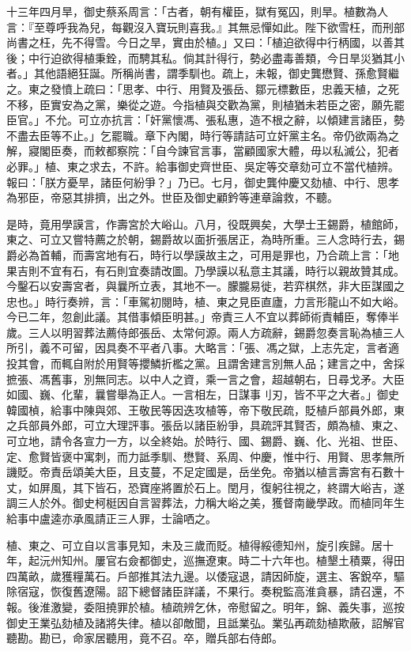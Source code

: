 \begin{pinyinscope}
十三年四月旱，御史蔡系周言：「古者，朝有權臣，獄有冤囚，則旱。植數為人言：『至尊呼我為兒，每觀沒入寶玩則喜我。』其無忌憚如此。陛下欲雪枉，而刑部尚書之枉，先不得雪。今日之旱，實由於植。」又曰：「植迫欲得中行柄國，以善其後；中行迫欲得植秉銓，而騁其私。倘其計得行，勢必盡毒善類，今日旱災猶其小者。」其他語絕狂誕。所稱尚書，謂季馴也。疏上，未報，御史龔懋賢、孫愈賢繼之。東之發憤上疏曰：「思孝、中行、用賢及張岳、鄒元標數臣，忠義天植，之死不移，臣實安為之黨，樂從之遊。今指植與交歡為黨，則植猶未若臣之密，願先罷臣官。」不允。可立亦抗言：「奸黨懷馮、張私惠，造不根之辭，以傾建言諸臣，勢不盡去臣等不止。」乞罷職。章下內閣，時行等請詰可立奸黨主名。帝仍欲兩為之解，寢閣臣奏，而敕都察院：「自今諫官言事，當顧國家大體，毋以私滅公，犯者必罪。」植、東之求去，不許。給事御史齊世臣、吳定等交章劾可立不當代植辨。報曰：「朕方憂旱，諸臣何紛爭？」乃已。七月，御史龔仲慶又劾植、中行、思孝為邪臣，帝惡其排擠，出之外。世臣及御史顧鈐等連章論救，不聽。

是時，竟用學謨言，作壽宮於大峪山。八月，役既興矣，大學士王錫爵，植館師，東之、可立又嘗特薦之於朝，錫爵故以面折張居正，為時所重。三人念時行去，錫爵必為首輔，而壽宮地有石，時行以學謨故主之，可用是罪也，乃合疏上言：「地果吉則不宜有石，有石則宜奏請改圖。乃學謨以私意主其議，時行以親故贊其成。今鑿石以安壽宮者，與曩所立表，其地不一。朦朧易徙，若弈棋然，非大臣謀國之忠也。」時行奏辨，言：「車駕初閱時，植、東之見臣直廬，力言形龍山不如大峪。今已二年，忽創此議。其借事傾臣明甚。」帝責三人不宜以葬師術責輔臣，奪俸半歲。三人以明習葬法薦侍郎張岳、太常何源。兩人方疏辭，錫爵忽奏言恥為植三人所引，義不可留，因具奏不平者八事。大略言：「張、馮之獄，上志先定，言者適投其會，而輒自附於用賢等攖鱗折檻之黨。且謂舍建言別無人品；建言之中，舍採摭張、馮舊事，別無同志。以中人之資，乘一言之會，超越朝右，日尋戈矛。大臣如國、巍、化輩，曩嘗舉為正人。一言相左，日謀事刂刃，皆不平之大者。」御史韓國楨，給事中陳與郊、王敬民等因迭攻植等，帝下敬民疏，貶植戶部員外郎，東之兵部員外郎，可立大理評事。張岳以諸臣紛爭，具疏評其賢否，頗為植、東之、可立地，請令各宣力一方，以全終始。於時行、國、錫爵、巍、化、光祖、世臣、定、愈賢皆褒中寓刺，而力詆季馴、懋賢、系周、仲慶，惟中行、用賢、思孝無所譏貶。帝責岳頌美大臣，且支蔓，不足定國是，岳坐免。帝猶以植言壽宮有石數十丈，如屏風，其下皆石，恐寶座將置於石上。閏月，復躬往視之，終謂大峪吉，遂調三人於外。御史柯梃因自言習葬法，力稱大峪之美，獲督南畿學政。而植同年生給事中盧逵亦承風請正三人罪，士論哂之。

植、東之、可立自以言事見知，未及三歲而貶。植得綏德知州，旋引疾歸。居十年，起沅州知州。屢官右僉都御史，巡撫遼東。時二十六年也。植墾土積粟，得田四萬畝，歲獲糧萬石。戶部推其法九邊。以倭寇退，請因師旋，選主、客銳卒，驅除宿寇，恢復舊遼陽。詔下總督諸臣詳議，不果行。奏稅監高淮貪暴，請召還，不報。後淮激變，委阻撓罪於植。植疏辨乞休，帝慰留之。明年，錦、義失事，巡按御史王業弘劾植及諸將失律。植以卻敵聞，且詆業弘。業弘再疏劾植欺蔽，詔解官聽勘。勘已，命家居聽用，竟不召。卒，贈兵部右侍郎。


\end{pinyinscope}
